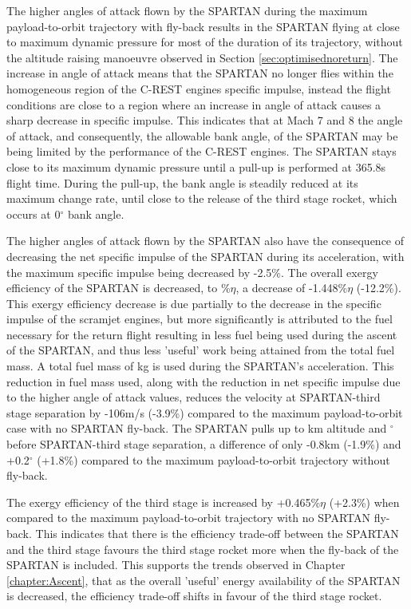  The higher angles of attack flown by the SPARTAN during the maximum payload-to-orbit trajectory with fly-back results in the SPARTAN flying at close to maximum dynamic pressure for most of the duration of its trajectory, without the altitude raising manoeuvre observed in Section \ref{sec:optimisednoreturn}.
 The increase in angle of attack means that the SPARTAN no longer flies within the homogeneous region of the C-REST engines specific impulse, instead the flight conditions are close to a region where an increase in angle of attack causes a sharp decrease in specific impulse. 
This indicates that at Mach 7 and 8 the angle of attack, and consequently, the allowable bank angle, of the SPARTAN may be being limited by the performance of the C-REST engines. 
 The SPARTAN stays close to its maximum dynamic pressure until a pull-up is performed at 365.8s flight time. During the pull-up, the bank angle is steadily reduced at its maximum change rate, until close to the release of the third stage rocket, which occurs at 0$^\circ$ bank angle. 

The higher angles of attack flown by the SPARTAN also have the consequence of decreasing the net specific impulse of the SPARTAN during its acceleration, with the maximum specific impulse being decreased by -2.5\%.
The overall exergy efficiency of the SPARTAN is decreased, to \secondExergyEffStandard\%$\eta$, a decrease of -1.448\%$\eta$ (-12.2\%). This exergy efficiency decrease is due partially to the decrease in the specific impulse of the scramjet engines, but more significantly is attributed to the fuel necessary for the return flight resulting in less fuel being used during the ascent of the SPARTAN, and thus less 'useful' work being attained from the total fuel mass.
A total fuel mass of \returnFuelStandard kg is used during the SPARTAN's acceleration. This reduction in fuel mass used, along with the reduction in net specific impulse due to the higher angle of attack values, reduces the velocity at SPARTAN-third stage separation by -106m/s (-3.9\%) compared to the maximum payload-to-orbit case with no SPARTAN fly-back. The SPARTAN pulls up to \secondthirdSeparationAltStandard km altitude and \secondthirdSeparationgammaStandard $^\circ$ before SPARTAN-third stage separation, a difference of only -0.8km (-1.9\%) and +0.2$^\circ$ (+1.8\%) compared to the maximum payload-to-orbit trajectory without fly-back. 

The exergy efficiency of the third stage is increased by +0.465\%$\eta$ (+2.3\%) when compared to the maximum payload-to-orbit trajectory with no SPARTAN fly-back. This indicates that there is the efficiency trade-off between the SPARTAN and the third stage favours the third stage rocket more when the fly-back of the SPARTAN is included. This supports the trends observed in Chapter \ref{chapter:Ascent}, that as the overall 'useful' energy availability of the SPARTAN is decreased, the efficiency trade-off shifts in favour of the third stage rocket.  


